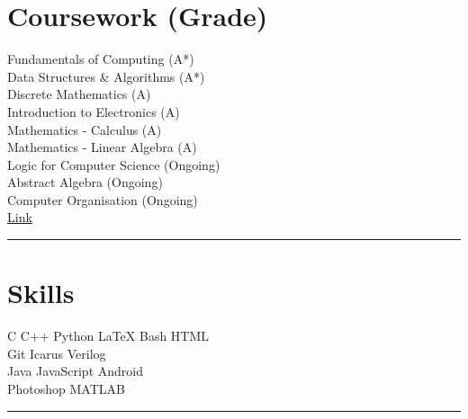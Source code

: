 \documentclass[letterpaper]{Formatting}
\begin{document}
\begin{minipage}[t]{0.3\textwidth}

\section{Coursework (Grade)}
Fundamentals of Computing (A*)\\
Data Structures \& Algorithms (A*)\\
Discrete Mathematics (A)\\
Introduction to Electronics (A)\\
Mathematics - Calculus (A)\\
Mathematics - Linear Algebra (A)\\
Logic for Computer Science (Ongoing)\\
Abstract Algebra (Ongoing)\\
Computer Organisation (Ongoing)\\\vspace{1ex}
 \href{https://drive.google.com/file/d/0B0--s-r8CTxgRHdGMm1iRnQxelU/view}{Link}
\sectionspace %
\vspace{-1ex}
\rule{5cm}{0.5pt}
\vspace{2ex}

\section{Skills}


C \textbullet{} C++ \textbullet{} Python \textbullet{} \LaTeX \textbullet{} Bash \textbullet{} HTML\\
Git \textbullet{} Icarus Verilog \\
Java \textbullet{} JavaScript \textbullet{} Android\\
Photoshop \textbullet{} MATLAB
\sectionspace %
\vspace{-1.5ex}
\rule{5cm}{0.5pt}
\vspace{2ex}



\end{minipage}
\end{document}
